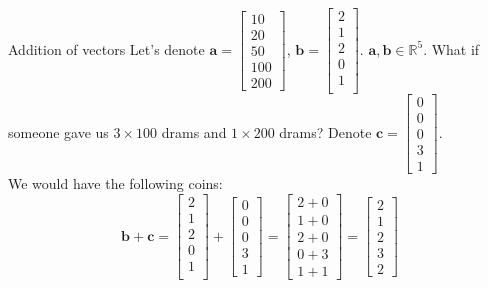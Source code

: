 \documentclass{beamer}
\begin{document}
\begin{frame}{Addition of vectors}
Let's denote $\mathbf{a} = \begin{bmatrix}
10 \\ 20 \\ 50 \\ 100 \\ 200
\end{bmatrix}$, $\mathbf{b} = \begin{bmatrix}
2 \\1 \\2 \\0 \\1 \\
\end{bmatrix}.$ \pause $\mathbf{a},\mathbf{b} \in \mathbb{R}^5$.
\pause What if someone gave us $3 \times 100$ drams and $1 \times 200$ drams?
\pause Denote $\mathbf{c} = \begin{bmatrix}
0 \\ 0 \\ 0 \\ 3 \\ 1
\end{bmatrix}$.\\
\pause We would have the following coins:
\[
\mathbf{b} + \mathbf{c} = \begin{bmatrix}
2 \\1 \\2 \\0 \\1 \\
\end{bmatrix} + \begin{bmatrix}
0 \\ 0 \\ 0 \\ 3 \\ 1
\end{bmatrix} = \begin{bmatrix}
2+0 \\ 1+0 \\ 2+0 \\ 0+3 \\ 1+1
\end{bmatrix} = \begin{bmatrix}
2 \\ 1 \\ 2 \\ 3 \\ 2
\end{bmatrix}
\]
\end{frame}
\end{document}
